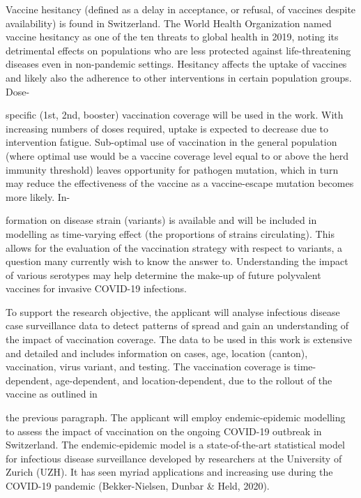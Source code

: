 \documentclass[authordate, rga]{jote-new-article}
\begin{document}
Vaccine hesitancy (defined as a delay in acceptance, or refusal, of vaccines despite availability) is found in Switzerland. The World Health Organization named vaccine hesitancy as one of the ten threats to global health in 2019, noting its detrimental effects on populations who are less protected against life-threatening diseases even in non-pandemic settings. Hesitancy affects the uptake of vaccines and likely also the adherence to other interventions in certain population groups. Dose-



specific (1st, 2nd, booster) vaccination coverage will be used in the work. With increasing numbers of doses required, uptake is expected to decrease due to intervention fatigue. Sub-optimal use of vaccination in the general population (where optimal use would be a vaccine coverage level equal to or above the herd immunity threshold) leaves opportunity for pathogen mutation, which in turn may reduce the effectiveness of the vaccine as a vaccine-escape mutation becomes more likely. In-



formation on disease strain (variants) is available and will be included in modelling as time-varying effect (the proportions of strains circulating). This allows for the evaluation of the vaccination strategy with respect to variants, a question many currently wish to know the answer to. Understanding the impact of various serotypes may help determine the make-up of future polyvalent vaccines for invasive COVID-19 infections.







To support the research objective, the applicant will analyse infectious disease case surveillance data to detect patterns of spread and gain an understanding of the impact of vaccination coverage. The data to be used in this work is extensive and detailed and includes information on cases, age, location (canton), vaccination, virus variant, and testing. The vaccination coverage is time-dependent, age-dependent, and location-dependent, due to the rollout of the vaccine as outlined in



the previous paragraph. The applicant will employ endemic-epidemic modelling to assess the impact of vaccination on the ongoing COVID-19 outbreak in Switzerland. The endemic-epidemic model is a state-of-the-art statistical model for infectious disease surveillance developed by researchers at the University of Zurich (UZH). It has seen myriad applications and increasing use during the COVID-19 pandemic (Bekker-Nielsen, Dunbar \& Held, 2020).
\end{document}

